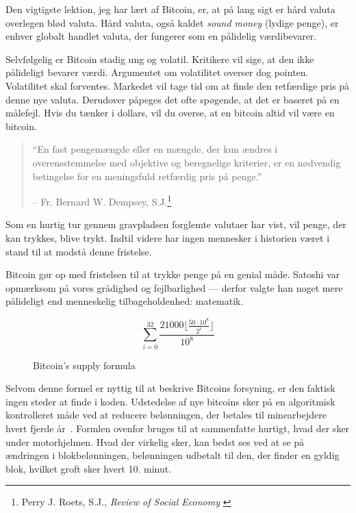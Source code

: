 Den vigtigste lektion, jeg har lært af Bitcoin, er, at på lang sigt er hård 
valuta overlegen blød valuta. Hård valuta, også kaldet \textit{sound money} 
(lydige penge), er enhver globalt handlet valuta, der fungerer som en pålidelig 
værdibevarer.

Selvfølgelig er Bitcoin stadig ung og volatil. Kritikere vil sige, at den ikke 
pålideligt bevarer værdi. Argumentet om volatilitet overser dog pointen. 
Volatilitet skal forventes. Markedet vil tage tid om at finde den retfærdige 
pris på denne nye valuta. Derudover påpeges det ofte spøgende, at det er 
baseret på en målefejl. Hvis du tænker i dollars, vil du overse, at en bitcoin 
altid vil være en bitcoin.

\begin{quotation}\begin{samepage}
\enquote{En fast pengemængde eller en mængde, der kun ændres i 
overensstemmelse med objektive og beregnelige kriterier, er en nødvendig 
betingelse for en meningsfuld retfærdig pris på penge.}
\begin{flushright} -- Fr. Bernard W. Dempsey, S.J.\footnote{Perry J. Roets, 
  S.J., \textit{Review of Social Economy} \cite{review-social-economy}}
\end{flushright}\end{samepage}\end{quotation}

\newpage

Som en hurtig tur gennem gravpladsen forglemte valutaer har vist,
vil penge, der kan trykkes, blive trykt. Indtil videre har ingen mennesker i
historien været i stand til at modstå denne fristelse.

Bitcoin gør op med fristelsen til at trykke penge på en genial
måde. Satoshi var opmærksom på vores grådighed og fejlbarlighed --- derfor 
valgte han noget mere pålideligt end menneskelig tilbageholdenhed: matematik.

\begin{figure}[htbp]
  \centering
  \begin{equation}
    \sum_{i=0}^{32} \frac{21000 \lfloor 
    \frac{50 \cdot 10^8}{2^i} \rfloor}{10^8}
  \end{equation}
  \caption{Bitcoin's supply formula}
  \label{fig:supply-formula-white}
\end{figure}

Selvom denne formel er nyttig til at beskrive Bitcoins forsyning, er den faktisk
ingen steder at finde i koden. Udstedelse af nye bitcoins sker på en
algoritmisk kontrolleret måde ved at reducere belønningen, der betales til
minearbejdere hvert fjerde år~\cite{btcwiki:supply}. Formlen ovenfor bruges til
at sammenfatte hurtigt, hvad der sker under motorhjelmen. Hvad der virkelig 
sker, kan bedst ses ved at se på ændringen i blokbelønningen, belønningen 
udbetalt til den, der finder en gyldig blok, hvilket groft sker hvert 10. minut.

